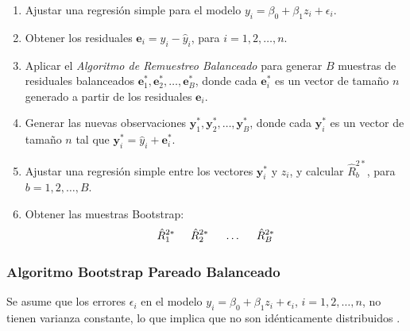 \begin{enumerate}
	\item Ajustar una regresión simple para el modelo \( y_{i} = \beta_{0} + \beta_{1}z_{i} + \epsilon_{i} \).
	
	\item Obtener los residuales \( \mathbf{e}_{i} = y_{i} - \hat{y}_{i} \), para \( i = 1, 2, \dots, n \).
	
	\item Aplicar el \textit{Algoritmo de Remuestreo Balanceado} para generar \( B \) muestras de residuales balanceados \( \mathbf{e}^{*}_{1}, \mathbf{e}^{*}_{2}, \dots, \mathbf{e}^{*}_{B} \), donde cada \( \mathbf{e}^{*}_{i} \) es un vector de tamaño \( n \) generado a partir de los residuales \( \mathbf{e}_{i} \).
	
	\item Generar las nuevas observaciones \( \mathbf{y}^{*}_{1}, \mathbf{y}^{*}_{2}, \dots, \mathbf{y}^{*}_{B} \), donde cada \( \mathbf{y}^{*}_{i} \) es un vector de tamaño \( n \) tal que \( \mathbf{y}^{*}_{i} = \hat{y}_{i} + \mathbf{e}^{*}_{i} \).
	
	\item Ajustar una regresión simple entre los vectores \( \mathbf{y}^{*}_{i} \) y \( z_{i} \), y calcular \( \hat{R}^{2*}_{b} \), para \( b = 1, 2, \dots, B \).
	
	\item Obtener las muestras Bootstrap:
	\[
	\hat{R}^{2*}_{1} \hspace{.5cm} \hat{R}^{2*}_{2} \hspace{.5cm} \dots \hspace{.5cm} \hat{R}^{2*}_{B}
	\]
\end{enumerate}


\subsubsection{Algoritmo Bootstrap Pareado Balanceado}

Se asume que los errores \( \epsilon_{i} \) en el modelo 
\( y_{i} = \beta_{0} + \beta_{1}z_{i} + \epsilon_{i} \), \( i = 1, 2, \dots, n \), no tienen varianza constante, lo que implica que no son idénticamente distribuidos \parencites{givens-2013, montgomery-2017}.

